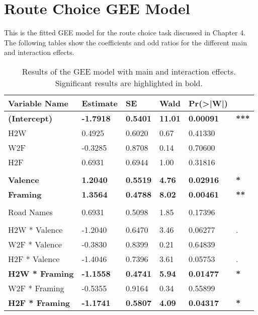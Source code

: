 \chapter{Route Choice GEE Model}
\label{AppendixA}

This is the fitted GEE model for the route choice task discussed in Chapter 4. The following tables show the coefficients and odd ratios for the different main and interaction effects.

\begin{table}[t]
    \caption{Results of the GEE model with main and interaction effects. Significant results are highlighted in bold.}
	\label{tab:s3-gee}
	\centering
	\begin{tabular}{llllll}
        \hline\hline
        Variable Name & Estimate & SE & Wald & Pr(\textgreater{}|W|) & \\
        \hline
        \textbf{(Intercept)} & \textbf{-1.7918} & \textbf{0.5401} & \textbf{11.01} & \textbf{0.00091} & \textbf{***} \\
        H2W & 0.4925 & 0.6020 & 0.67 & 0.41330 & \\
        W2F & -0.3285 & 0.8708 & 0.14 & 0.70600 & \\
        H2F & 0.6931 & 0.6944 & 1.00 & 0.31816 & \\
        & & & & & \\
        \textbf{Valence} & \textbf{1.2040} & \textbf{0.5519} & \textbf{4.76} & \textbf{0.02916} & \textbf{*}  \\
        \textbf{Framing} & \textbf{1.3564} & \textbf{0.4788} & \textbf{8.02} & \textbf{0.00461} & \textbf{**} \\ 
        & & & & & \\
        Road Names & 0.6931 & 0.5098 & 1.85 & 0.17396 & \\
        & & & & & \\
        H2W * Valence & -1.2040 & 0.6470 & 3.46 & 0.06277 & . \\
        W2F * Valence & -0.3830 & 0.8399 & 0.21 & 0.64839 & \\
        H2F * Valence & -1.4046 & 0.7396 & 3.61 & 0.05753 & . \\
        \textbf{H2W * Framing} & \textbf{-1.1558} & \textbf{0.4741} & \textbf{5.94} & \textbf{0.01477} & \textbf{*}  \\
        W2F * Framing & -0.5355 & 0.9164 & 0.34 & 0.55899 & \\
        \textbf{H2F * Framing} & \textbf{-1.1741} & \textbf{0.5807} & \textbf{4.09} & \textbf{0.04317} & \textbf{*}  \\

\end{tabular}
\end{table}
